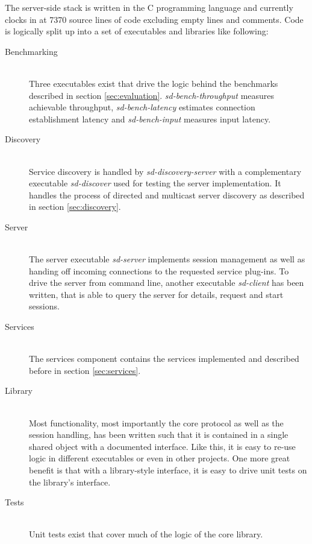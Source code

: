 The server-side stack is written in the C programming language and currently clocks in at 7370 source lines of code excluding empty lines and comments.
Code is logically split up into a set of executables and libraries like following:
\begin{description}
    \item[Benchmarking]\hfill\\
        Three executables exist that drive the logic behind the benchmarks described in section \ref{sec:evaluation}.
        \emph{sd-bench-throughput} measures achievable throughput, \emph{sd-bench-latency} estimates connection establishment latency and \emph{sd-bench-input} measures input latency.
    \item[Discovery]\hfill\\
        Service discovery is handled by \emph{sd-discovery-server} with a complementary executable \emph{sd-discover} used for testing the server implementation.
        It handles the process of directed and multicast server discovery as described in section \ref{sec:discovery}.
    \item[Server]\hfill\\
        The server executable \emph{sd-server} implements session management as well as handing off incoming connections to the requested service plug-ins.
        To drive the server from command line, another executable \emph{sd-client} has been written, that is able to query the server for details, request and start sessions.
    \item[Services]\hfill\\
        The services component contains the services implemented and described before in section \ref{sec:services}.
    \item[Library]\hfill\\
        Most functionality, most importantly the core protocol as well as the session handling, has been written such that it is contained in a single shared object with a documented interface.
        Like this, it is easy to re-use logic in different executables or even in other projects.
        One more great benefit is that with a library-style interface, it is easy to drive unit tests on the library's interface.
    \item[Tests]\hfill\\
        Unit tests exist that cover much of the logic of the core library.
\end{description}

